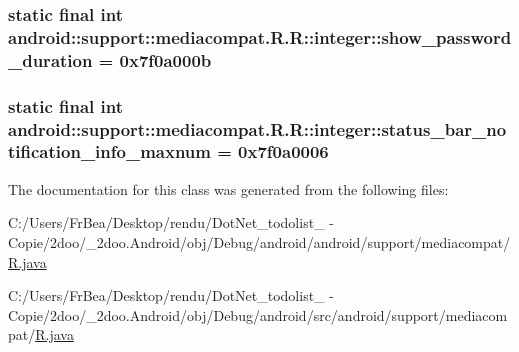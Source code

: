 \hypertarget{classandroid_1_1support_1_1mediacompat_1_1_r_1_1integer_dd04f413195d77e519a885e729a00e0a}{
\subsubsection[{show\_\-password\_\-duration}]{\setlength{\rightskip}{0pt plus 5cm}static final int android::support::mediacompat.R.R::integer::show\_\-password\_\-duration = 0x7f0a000b}}
\label{classandroid_1_1support_1_1mediacompat_1_1_r_1_1integer_dd04f413195d77e519a885e729a00e0a}


\hypertarget{classandroid_1_1support_1_1mediacompat_1_1_r_1_1integer_50c21f0643abffdbb953721285d6694d}{
\subsubsection[{status\_\-bar\_\-notification\_\-info\_\-maxnum}]{\setlength{\rightskip}{0pt plus 5cm}static final int android::support::mediacompat.R.R::integer::status\_\-bar\_\-notification\_\-info\_\-maxnum = 0x7f0a0006}}
\label{classandroid_1_1support_1_1mediacompat_1_1_r_1_1integer_50c21f0643abffdbb953721285d6694d}




The documentation for this class was generated from the following files:\begin{CompactItemize}
\item 
C:/Users/FrBea/Desktop/rendu/DotNet\_\-todolist\_ - Copie/2doo/\_\-2doo.Android/obj/Debug/android/android/support/mediacompat/\hyperlink{android_2support_2mediacompat_2_r_8java}{R.java}\item 
C:/Users/FrBea/Desktop/rendu/DotNet\_\-todolist\_ - Copie/2doo/\_\-2doo.Android/obj/Debug/android/src/android/support/mediacompat/\hyperlink{src_2android_2support_2mediacompat_2_r_8java}{R.java}\end{CompactItemize}
